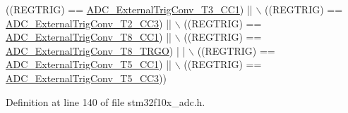 \begin{DoxyCode}
                                  ((REGTRIG) == \hyperlink{group___a_d_c__external__trigger__sources__for__regular__channels__conversion_ga3c73d5c8bb0f898dbbc74bcc536f6ec1}{ADC\_ExternalTrigConv\_T3\_CC1}) || 
      \(\backslash\)
                                  ((REGTRIG) == \hyperlink{group___a_d_c__external__trigger__sources__for__regular__channels__conversion_ga16ae1b335f2c2b4facf3d4bedc2ce27f}{ADC\_ExternalTrigConv\_T2\_CC3}) || 
      \(\backslash\)
                                  ((REGTRIG) == \hyperlink{group___a_d_c__external__trigger__sources__for__regular__channels__conversion_ga97af875d12e77a67e84f3aaf1f8033ed}{ADC\_ExternalTrigConv\_T8\_CC1}) || 
      \(\backslash\)
                                  ((REGTRIG) == \hyperlink{group___a_d_c__external__trigger__sources__for__regular__channels__conversion_gab26d94590d47ae6ec46841652741abf3}{ADC\_ExternalTrigConv\_T8\_TRGO}) |
      | \(\backslash\)
                                  ((REGTRIG) == \hyperlink{group___a_d_c__external__trigger__sources__for__regular__channels__conversion_ga6bd1ad69cb455afeabf6759b640378d3}{ADC\_ExternalTrigConv\_T5\_CC1}) || 
      \(\backslash\)
                                  ((REGTRIG) == \hyperlink{group___a_d_c__external__trigger__sources__for__regular__channels__conversion_ga95b58981aff35d6d5fa229925cd6315d}{ADC\_ExternalTrigConv\_T5\_CC3}))
\end{DoxyCode}


Definition at line 140 of file stm32f10x\+\_\+adc.\+h.

